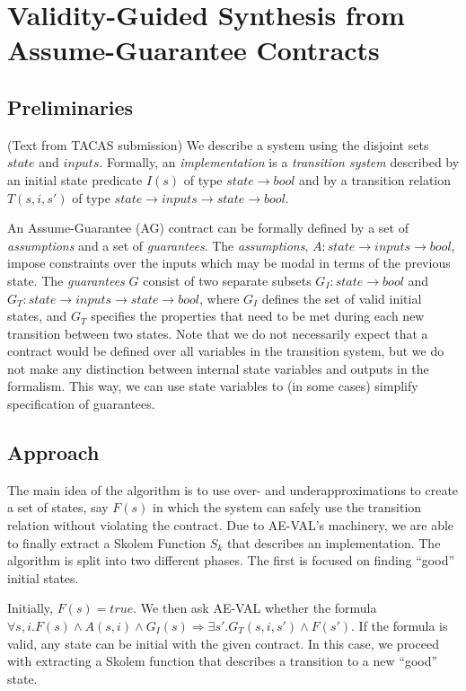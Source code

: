 \documentclass{article}
\begin{document}
\section{Validity-Guided Synthesis from Assume-Guarantee Contracts}

\subsection{Preliminaries}
(Text from TACAS submission)
We describe a system using the disjoint sets $state$ and $inputs$.
Formally, an \emph{implementation} is a \emph{transition system}
described by an initial state predicate $I(s)$ of type $state \to
bool$ and by a transition relation $T(s,i,s')$ of type $state \to
inputs \to state \to bool$.

An Assume-Guarantee (AG) contract can be formally defined by a set of
\emph{assumptions} and a set of \emph{guarantees}. The
\emph{assumptions}, $A: state \rightarrow inputs \rightarrow bool$,
impose constraints over the inputs which may be modal in terms of the
previous state. The \emph{guarantees} $G$ consist of two separate
subsets $G_I: state \rightarrow bool$ and $G_T: state \rightarrow
inputs \rightarrow state \rightarrow bool$, where $G_I$ defines the
set of valid initial states, and $G_T$ specifies the properties that
need to be met during each new transition between two states. Note
that we do not necessarily expect that a contract would be defined
over all variables in the transition system, but we do not make any
distinction between internal state variables and outputs in the
formalism. This way, we can use state variables to (in some cases)
simplify specification of guarantees.

\subsection{Approach}

The main idea of the algorithm is to use over- and underapproximations to
create a set of states, say $F(s)$ in which the system can safely use the
transition relation without violating the contract. Due to AE-VAL's machinery,
we are able to finally extract a Skolem Function $S_k$ that describes an
implementation. The algorithm is split into two different phases. The first is
focused on finding ``good'' initial states.

Initially, $F(s) = true$. We then ask AE-VAL whether the formula $\forall s,i.
F(s) \land A(s,i) \land G_{I}(s) \Rightarrow \exists s'. G_{T}(s,i,s') \land
F(s')$.
If the formula is valid, any state can be initial with the given contract. In
this case, we proceed with extracting a Skolem function that describes a
transition to a new ``good'' state.
\end{document}
